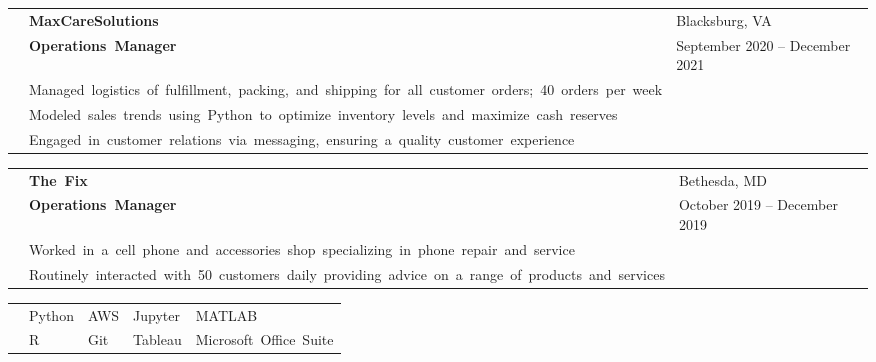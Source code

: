 \documentclass[12pt, letter]{book}
\begin{document}
\vspace{2mm}

\noindent
\begin{tabular}{@{}>{\raggedright\arraybackslash}p{3.5cm}@{}p{5cm}@{}>{\raggedleft\arraybackslash}p{10.5cm}@{}}
    & \textbf{\footnotesize\mbox{MaxCareSolutions }} & {\footnotesize {Blacksburg, VA}} \\
    & \textbf{\footnotesize\mbox{Operations Manager}} & {\footnotesize {September 2020 – December 2021}} \\
    & {\footnotesize\mbox{Managed logistics of fulfillment, packing, and shipping for all customer orders; 40 orders per week}} \\
    & {\footnotesize\mbox{Modeled sales trends using Python to optimize inventory levels and maximize cash reserves}} \\
    & {\footnotesize\mbox{Engaged in customer relations via messaging, ensuring a quality customer experience}}
\end{tabular}

\vspace{2mm}

\noindent
\begin{tabular}{@{}>{\raggedright\arraybackslash}p{3.5cm}@{}p{5cm}@{}>{\raggedleft\arraybackslash}p{10.5cm}@{}}
    & \textbf{\footnotesize\mbox{The Fix }} & {\footnotesize {Bethesda, MD}} \\
    & \textbf{\footnotesize\mbox{Operations Manager}} & {\footnotesize {October 2019 – December 2019}} \\
    & {\footnotesize\mbox{Worked in a cell phone and accessories shop specializing in phone repair and service}} \\
    & {\footnotesize\mbox{Routinely interacted with 50 customers daily providing advice on a range of products and services}}
\end{tabular}

\vspace{2mm}


\noindent
\begin{tabular}{@{}>{\raggedright\arraybackslash}p{3.5cm}@{}p{3cm}p{3cm}p{3cm}p{3cm}@{}}
    {\footnotesize{TECHNICAL}} & {\footnotesize{Python}} & {\footnotesize{AWS}} & {\footnotesize{Jupyter}} & {\footnotesize{MATLAB}} \\
    {\footnotesize{SKILLS}} & {\footnotesize{R}} & {\footnotesize{Git}} & {\footnotesize{Tableau}} & \footnotesize\mbox{{Microsoft Office Suite}} \\
\end{tabular}
\end{document}
